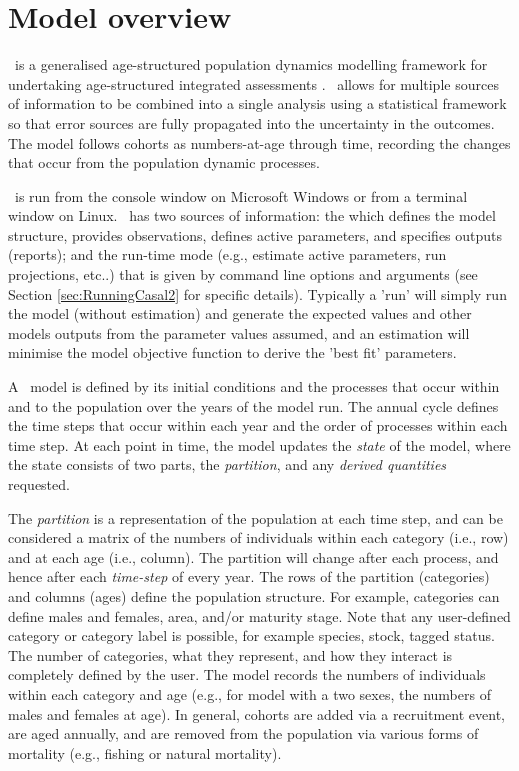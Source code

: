 \section{Model overview\label{sec:Overview}}

\CNAME\ is a generalised age-structured population dynamics modelling framework for undertaking age-structured integrated assessments \citep{Maunder_2013}. \CNAME\ allows for multiple sources of information to be combined into a single analysis using a statistical framework so that error sources are fully propagated into the uncertainty in the outcomes. The model follows cohorts as numbers-at-age through time, recording the changes that occur from the population dynamic processes.

\CNAME\ is run from the console window on Microsoft Windows or from a terminal window on Linux. \CNAME\ has two sources of information: the \emph{\config} which  defines the model structure, provides observations, defines active parameters, and specifies outputs (reports); and the run-time mode (e.g., estimate active parameters, run projections, etc..) that is given by command line options and arguments (see Section \ref{sec:RunningCasal2} for specific details). Typically a 'run' will simply run the model (without estimation) and generate the expected values and other models outputs from the parameter values assumed, and an estimation will minimise the model objective function to derive the 'best fit' parameters.

A \CNAME\ model is defined by its initial conditions and the processes that occur within and to the population over the years of the model run. The annual cycle defines the time steps that occur within each year and the order of processes within each time step. At each point in time, the model updates the \emph{state} of the model, where the state consists of two parts, the \emph{partition}, and any \emph{derived quantities} requested.

The \emph{partition} is a representation of the population at each time step, and can be considered a matrix of the numbers of individuals within each category (i.e., row) and at each age (i.e., column). The partition will change after each process, and hence after each \emph{time-step} of every year. The rows of the partition (categories) and columns (ages) define the population structure. For example, categories can define males and females, area, and/or maturity stage. Note that any user-defined category or category label is possible, for example species, stock, tagged status. The number of categories, what they represent, and how they interact is completely defined by the user. The model records the numbers of individuals within each category and age (e.g., for model with a two sexes, the numbers of males and females at age). In general, cohorts are added via a recruitment event, are aged annually, and are removed from the population via various forms of mortality (e.g., fishing or natural mortality).

